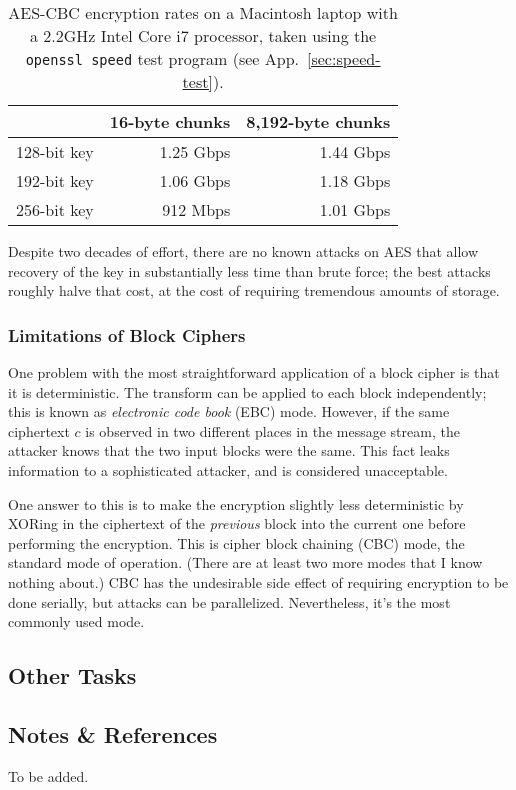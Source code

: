 \begin{table}
\begin{tabular}{l | r | r}
            & 16-byte chunks & 8,192-byte chunks \\\hline
128-bit key & 1.25 Gbps & 1.44 Gbps \\
192-bit key & 1.06 Gbps & 1.18 Gbps \\
256-bit key & 912 Mbps & 1.01 Gbps
\end{tabular}
\caption{AES-CBC encryption rates on a Macintosh laptop with a 2.2GHz
  Intel Core i7 processor, taken using the {\tt openssl speed} test
  program (see App.~\ref{sec:speed-test}).}
\label{tab:mac-aes}
\end{table}

Despite two decades of effort, there are no known attacks on AES that
allow recovery of the key in substantially less time than brute force;
the best attacks roughly halve that cost, at the cost of requiring
tremendous amounts of storage. 

\subsubsection{Limitations of Block Ciphers}

One problem with the most straightforward application of a block
cipher is that it is deterministic.  The transform can be applied to
each block independently; this is known as \emph{electronic code book}
(EBC) mode.  However, if the same ciphertext $c$ is observed in two
different places in the message stream, the attacker knows that the
two input blocks were the same.  This fact leaks information to a
sophisticated attacker, and is considered unacceptable.

One answer to this is to make the encryption slightly less
deterministic by XORing in the ciphertext of the \emph{previous} block into
the current one before performing the encryption.  This is cipher
block chaining (CBC) mode, the standard mode of operation.  (There are
at least two more modes that I know nothing about.)  CBC has the
undesirable side effect of requiring encryption to be done serially,
but attacks can be parallelized.  Nevertheless, it's the most commonly
used mode.

\subsection{Other Tasks}




\subsection{Notes \& References}

To be added.

